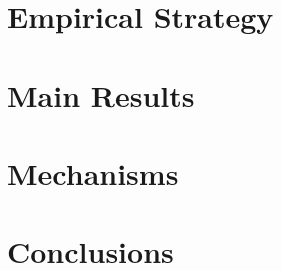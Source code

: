 \documentclass[dvipdfmx,11pt]{beamer}
\begin{document}
\section{Empirical Strategy}
\frame{\sectionpage}

\section{Main Results}
\frame{\sectionpage}

\section{Mechanisms}
\frame{\sectionpage}

\section{Conclusions}
\frame{\sectionpage}
\end{document}
